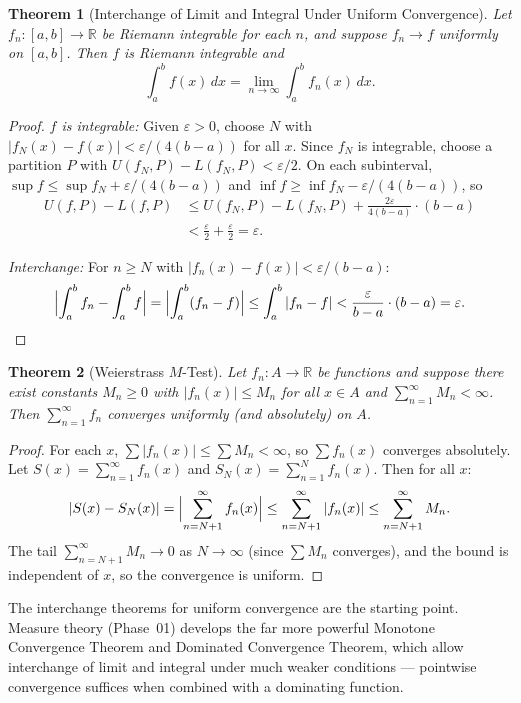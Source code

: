 \documentclass[11pt,a4paper]{article}
\theoremstyle{definition}
\theoremstyle{plain}
\newtheorem{theorem}{Theorem}[section]
\theoremstyle{remark}
\newcommand{\R}{\mathbb{R}}
\begin{document}
\begin{theorem}[Interchange of Limit and Integral Under Uniform Convergence]
\label{thm:uniform_integral}
Let $f_n : [a, b] \to \R$ be Riemann integrable for each $n$, and suppose
$f_n \to f$ uniformly on $[a, b]$. Then $f$ is Riemann integrable and
\[
\int_a^b f(x)\,dx = \lim_{n \to \infty} \int_a^b f_n(x)\,dx.
\]
\end{theorem}

\begin{proof}
\emph{$f$ is integrable:} Given $\varepsilon > 0$, choose $N$ with
$|f_N(x) - f(x)| < \varepsilon/(4(b-a))$ for all $x$. Since $f_N$ is integrable,
choose a partition $P$ with $U(f_N, P) - L(f_N, P) < \varepsilon/2$. On each
subinterval, $\sup f \le \sup f_N + \varepsilon/(4(b-a))$ and
$\inf f \ge \inf f_N - \varepsilon/(4(b-a))$, so
\begin{align*}
U(f, P) - L(f, P)
&\le U(f_N, P) - L(f_N, P) + \frac{2\varepsilon}{4(b-a)} \cdot (b - a) \\
&< \frac{\varepsilon}{2} + \frac{\varepsilon}{2} = \varepsilon.
\end{align*}

\emph{Interchange:} For $n \ge N$ with $|f_n(x) - f(x)| < \varepsilon/(b-a)$:
\[
\Bigl|\int_a^b f_n - \int_a^b f\Bigr|
= \Bigl|\int_a^b (f_n - f)\Bigr|
\le \int_a^b |f_n - f|
< \frac{\varepsilon}{b - a} \cdot (b - a) = \varepsilon. \qedhere
\]
\end{proof}

\begin{theorem}[Weierstrass $M$-Test]
\label{thm:weierstrass_m}
Let $f_n : A \to \R$ be functions and suppose there exist constants $M_n \ge 0$
with $|f_n(x)| \le M_n$ for all $x \in A$ and $\sum_{n=1}^\infty M_n < \infty$.
Then $\sum_{n=1}^\infty f_n$ converges uniformly (and absolutely) on $A$.
\end{theorem}

\begin{proof}
For each $x$, $\sum |f_n(x)| \le \sum M_n < \infty$, so $\sum f_n(x)$ converges
absolutely. Let $S(x) = \sum_{n=1}^\infty f_n(x)$ and
$S_N(x) = \sum_{n=1}^N f_n(x)$. Then for all $x$:
\[
|S(x) - S_N(x)| = \Bigl|\sum_{n=N+1}^\infty f_n(x)\Bigr|
\le \sum_{n=N+1}^\infty |f_n(x)|
\le \sum_{n=N+1}^\infty M_n.
\]
The tail $\sum_{n=N+1}^\infty M_n \to 0$ as $N \to \infty$ (since $\sum M_n$
converges), and the bound is independent of $x$, so the convergence is uniform.
\end{proof}

\begin{keyresult}
The interchange theorems for uniform convergence are the starting point.
Measure theory (Phase~01) develops the far more powerful Monotone Convergence
Theorem and Dominated Convergence Theorem, which allow interchange of limit
and integral under much weaker conditions --- pointwise convergence suffices
when combined with a dominating function.
\end{keyresult}
\end{document}
